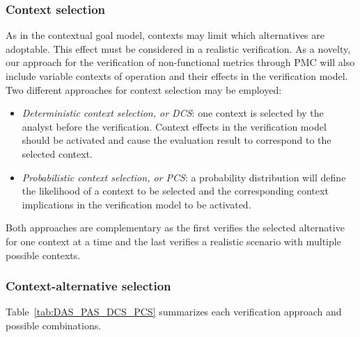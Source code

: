 \subsubsection{Context selection}

As in the contextual goal model, contexts may limit which alternatives are adoptable. This effect must be considered in a realistic verification. As a novelty, our approach for the verification of non-functional metrics through PMC will also include variable contexts of operation and their effects in the verification model. Two different approaches for context selection may be employed: 

\begin{itemize}

\item \textit{Deterministic context selection, or DCS}: one context is selected by the analyst before the verification. Context effects in the verification model should be activated and cause the evaluation result to correspond to the selected context.
\medskip

\item \textit{Probabilistic context selection, or PCS}: a probability distribution will define the likelihood of a context to be selected and the corresponding context implications in the verification model to be activated.  

\end{itemize}

Both approaches are complementary as the first verifies the selected alternative for one context at a time and the last verifies a realistic scenario with multiple possible contexts. 

\subsubsection{Context-alternative selection}

Table~\ref{tab:DAS_PAS_DCS_PCS} summarizes each verification approach and possible combinations.

